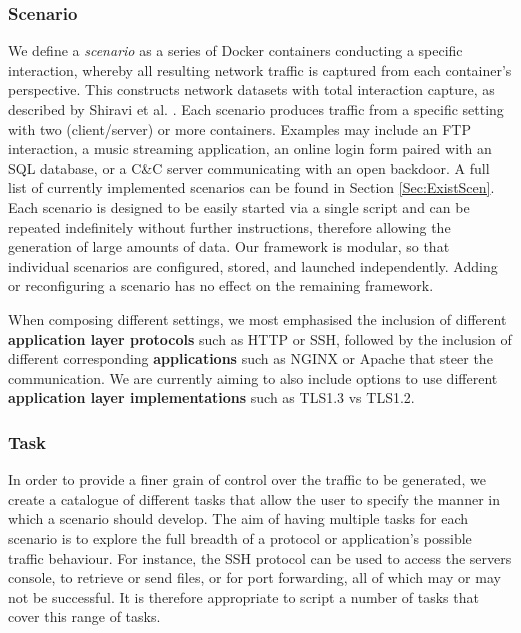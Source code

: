 \documentclass[sigconf]{acmart}
\begin{document}
\subsubsection*{Scenario}
We define a \emph{scenario} as a series of Docker containers conducting a specific interaction, whereby all resulting network traffic is captured from each container's perspective. This constructs network datasets with total interaction capture, as described by Shiravi et al. \cite{shiravi2012toward}. Each scenario produces traffic from a specific setting with two (client/server) or more containers. 
Examples may include an FTP interaction, a music streaming application, an online login form paired with an SQL database, or a C\&C server communicating with an open backdoor. A full list of currently implemented scenarios can be found in Section \textcolor{red}{\ref{Sec:ExistScen}}.
Each scenario is designed to be easily started via a single script and can be repeated indefinitely without further instructions, therefore allowing the generation of large amounts of data.
Our framework is modular, so that individual scenarios are configured, stored, and launched independently. Adding or reconfiguring a scenario has no effect on the remaining framework.

When composing different settings, we most emphasised the inclusion of different \textbf{application layer protocols} such as HTTP or SSH, followed by the inclusion of different corresponding \textbf{applications} such as NGINX or Apache that steer the communication. We are currently aiming to also include options to use different \textbf{application layer implementations} such as TLS1.3 vs TLS1.2.

\subsubsection*{Task} \label{Sec:Subscenarios}

In order to provide a finer grain of control over the traffic to be generated, we create a catalogue of different tasks that allow the user to specify the manner in which a scenario should develop. The aim of having multiple tasks for each scenario is to explore the full breadth of a protocol or application's possible traffic behaviour. For instance, the SSH protocol can be used to access the servers console, to retrieve or send files, or for port forwarding, all of which may or may not be successful. It is therefore appropriate to script a number of tasks that cover this range of tasks.
\end{document}
